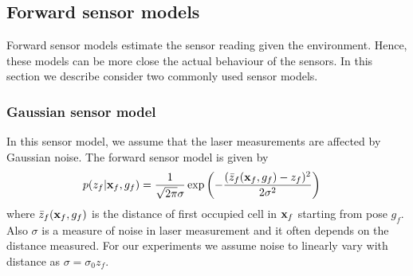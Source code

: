 \documentclass[letterpaper, 10 pt, conference]{ieeeconf} %
\begin{document}

\subsection{Forward sensor models}
\label{sec:forward}
Forward sensor models estimate the sensor reading given the environment.
Hence, these models can be more close the actual behaviour of the sensors.
In this section we describe consider two commonly used sensor models.

\subsubsection{Gaussian sensor model}
\newcommand{\actz}{\bar{z}_f(\map_f, g_f)}
In this sensor model, we assume that the laser measurements are affected by
Gaussian noise. The forward sensor model is given by
\begin{align}
  p(z_f|\map_f, g_f) &=
  \frac{1}{\sqrt{2\pi}\sigma}\exp\left(-\frac{(\actz - z_f)^2}{2\sigma^2}\right)
  \label{eq:gaussiansensormodel}
\end{align}
where $\actz$ is the distance of first occupied cell in $\mathbf{x}_f$ starting
from pose $g_f$. Also $\sigma$ is a measure of noise in laser measurement and
it often depends on the distance measured. For our experiments we assume noise
to linearly vary with distance as $\sigma = \sigma_0z_f$. 
\end{document}
